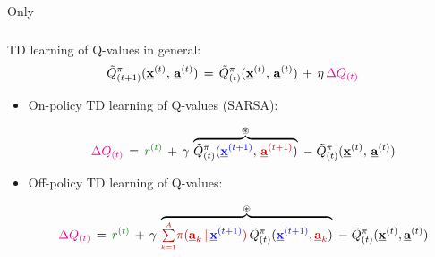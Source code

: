 \begin{frame}{Only} \frametitle{\subsecname}
	
	TD learning of Q-values in general:
	\begin{equation}
			\tilde{Q}^\pi_{(t+1)}(\underline{\mathbf{x}}^{(t)},\, \underline{\mathbf{a}}^{(t)} )
			\,= \,
			\tilde{Q}^\pi_{(t)}( \underline{\mathbf{x}}^{(t)},\, \underline{\mathbf{a}}^{(t)} ) \, + \, \eta \, {\color{magenta}\Delta Q_{(t)}}
	\end{equation}
	
	
	
	\begin{itemize}
		\item<only@2> On-policy TD learning of Q-values (SARSA):
		
		\begin{equation}
				{\color{magenta}\Delta Q_{(t)}} \,=\, {\color{reward} r^{(t)}} \, + \, \gamma \, \overbrace{\tilde{Q}^\pi_{(t)} ({\color{trans}  \vec x^{(t+1)}},\,{\color{policy}  \vec a^{(t+1)}} )}^{\circledast} \;-\; \tilde{Q}^\pi_{(t)} ( \vec x^{(t)},\, \vec a^{(t)} )
				\label{eq:deltaqONpolicy}
		\end{equation}
		
		\item<only@2,3> Off-policy TD learning of Q-values:
		
		\slidesonly{\vspace{-5mm}}
		
		\begin{equation}
					{\color{magenta}\Delta Q_{(t)}} \,=\, {\color{reward}r^{(t)}} 
				 \, + \, \gamma \, \overbrace{{\color{policy}\smallsum{k=1}{A}
					\pi(\vec a_k \,|\, {\color{trans}\vec x^{(t+1)}})} \,
					\tilde{Q}^\pi_{(t)}({\color{trans}\vec x^{(t+1)}}, {\color{policy}\vec a_k})}^{\circledast} 
				\;-\; \tilde{Q}^\pi_{(t)}(\vec x^{(t)}, \vec a^{(t)})
				\label{eq:deltaqOFFpolicy}
		\end{equation}
		

\end{itemize}
\end{frame}
